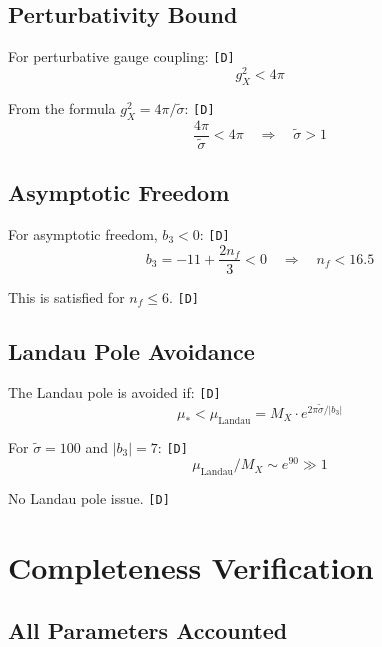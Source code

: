 \documentclass[11pt,a4paper]{article}
\newcommand{\tagD}{\textcolor{green!50!black}{\texttt{[D]}}}
\theoremstyle{definition}
\begin{document}
\subsection{Perturbativity Bound}
\label{app:perturbativity}

For perturbative gauge coupling: \tagD{}
\begin{equation}
\label{eq:app-pert-1}
g_X^2 < 4\pi
\end{equation}

From the formula $g_X^2 = 4\pi/\tilde{\sigma}$: \tagD{}
\begin{equation}
\label{eq:app-pert-2}
\frac{4\pi}{\tilde{\sigma}} < 4\pi \quad \Rightarrow \quad \tilde{\sigma} > 1
\end{equation}

\subsection{Asymptotic Freedom}
\label{app:asymptotic}

For asymptotic freedom, $b_3 < 0$: \tagD{}
\begin{equation}
\label{eq:app-af-1}
b_3 = -11 + \frac{2n_f}{3} < 0 \quad \Rightarrow \quad n_f < 16.5
\end{equation}

This is satisfied for $n_f \leq 6$. \tagD{}

\subsection{Landau Pole Avoidance}
\label{app:landau}

The Landau pole is avoided if: \tagD{}
\begin{equation}
\label{eq:app-lp-1}
\mu_* < \mu_{\text{Landau}} = M_X \cdot e^{2\pi\tilde{\sigma}/|b_3|}
\end{equation}

For $\tilde{\sigma} = 100$ and $|b_3| = 7$: \tagD{}
\begin{equation}
\label{eq:app-lp-2}
\mu_{\text{Landau}} / M_X \sim e^{90} \gg 1
\end{equation}

No Landau pole issue. \tagD{}

\section{Completeness Verification}
\label{app:completeness}

\subsection{All Parameters Accounted}
\label{app:all-params}
\end{document}
